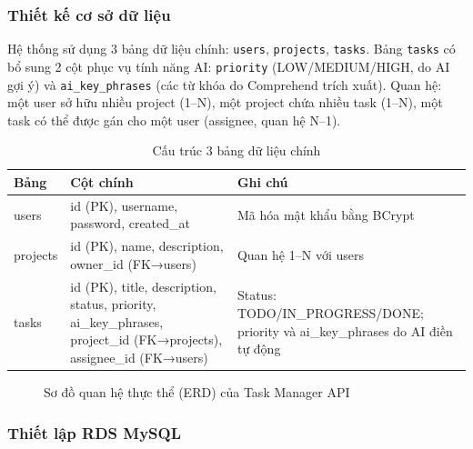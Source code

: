 \documentclass[13pt]{extarticle}
\begin{document}
\subsubsection{Thiết kế cơ sở dữ liệu}

Hệ thống sử dụng 3 bảng dữ liệu chính: \texttt{users}, \texttt{projects},
\texttt{tasks}. Bảng \texttt{tasks} có bổ sung 2 cột phục vụ tính năng AI:
\texttt{priority} (LOW/MEDIUM/HIGH, do AI gợi ý) và \texttt{ai\_key\_phrases}
(các từ khóa do Comprehend trích xuất). Quan hệ: một user sở hữu nhiều
project (1--N), một project chứa nhiều task (1--N), một task có thể được
gán cho một user (assignee, quan hệ N--1).

\begin{longtable}{p{3cm}p{4cm}p{6cm}}
\caption{Cấu trúc 3 bảng dữ liệu chính}
\label{tab:db-schema} \\
\toprule
\textbf{Bảng} & \textbf{Cột chính} & \textbf{Ghi chú} \\
\midrule
\endhead
users & id (PK), username, password, created\_at & Mã hóa mật khẩu bằng BCrypt \\
projects & id (PK), name, description, owner\_id (FK→users) & Quan hệ 1--N với users \\
tasks & id (PK), title, description, status, priority, ai\_key\_phrases, project\_id (FK→projects), assignee\_id (FK→users) & Status: TODO/IN\_PROGRESS/DONE; priority và ai\_key\_phrases do AI điền tự động \\
\bottomrule
\end{longtable}

\begin{figure}[H]
    \centering
    \caption{Sơ đồ quan hệ thực thể (ERD) của Task Manager API}
    \label{fig:erd}
\end{figure}

\subsubsection{Thiết lập RDS MySQL}
\end{document}
